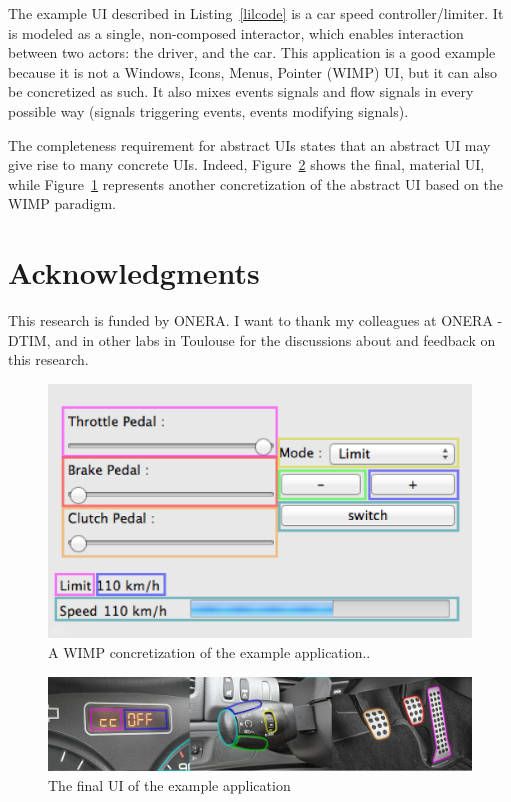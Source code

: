\documentclass{sigchi}
\begin{document}
The example UI described in Listing~\ref{lilcode} is a car speed controller/limiter. It is modeled as a single, non-composed interactor, which enables interaction between two actors: the driver, and the car. This application is a good example because it is not a Windows, Icons, Menus, Pointer (WIMP) UI, but it can also be concretized as such. It also mixes events signals and flow signals in every possible way (signals triggering events, events modifying signals). 

The completeness requirement for abstract UIs \cite{abstractuiw3} states that an abstract UI may give rise to many concrete UIs. Indeed, Figure~\ref{fig:actualcontrols} shows the final, material UI, while Figure~\ref{fig:screenshot} represents another concretization of the abstract UI based on the WIMP paradigm.

\section{Acknowledgments}

This research is funded by ONERA. I want to thank my colleagues at ONERA - DTIM, and in other labs in Toulouse for the discussions about and feedback on this research.

\begin{figure}[htbp]
\begin{center}
\includegraphics[width=\columnwidth]{screenshothighlighted.png}
\caption{A WIMP concretization of the example application..}
\label{fig:screenshot}
\end{center}
\end{figure}


\begin{figure}[htbp]
\begin{center}
\includegraphics[width=\textwidth]{screenshothighlightedhoriz.jpg}
\caption{The final UI of the example application}
\label{fig:actualcontrols}
\end{center}
\end{figure}
\end{document}
